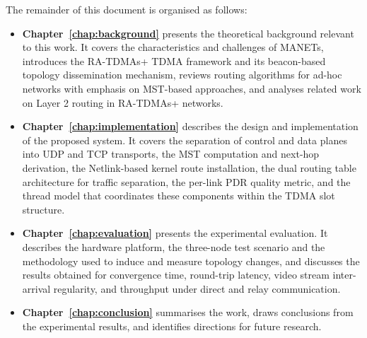 The remainder of this document is organised as follows:

\begin{itemize}

    \item \textbf{Chapter~\ref{chap:background}} presents the theoretical
    background relevant to this work. It covers the characteristics and
    challenges of MANETs, introduces the RA-TDMAs+ TDMA framework and its
    beacon-based topology dissemination mechanism, reviews routing algorithms
    for ad-hoc networks with emphasis on MST-based approaches, and analyses
    related work on Layer 2 routing in RA-TDMAs+ networks.

    \item \textbf{Chapter~\ref{chap:implementation}} describes the design and
    implementation of the proposed system. It covers the separation of control
    and data planes into UDP and TCP transports, the MST computation and
    next-hop derivation, the Netlink-based kernel route installation, the dual
    routing table architecture for traffic separation, the per-link PDR quality
    metric, and the thread model that coordinates these components within the
    TDMA slot structure.

    \item \textbf{Chapter~\ref{chap:evaluation}} presents the experimental
    evaluation. It describes the hardware platform, the three-node test
    scenario and the methodology used to induce and measure topology changes,
    and discusses the results obtained for convergence time, round-trip
    latency, video stream inter-arrival regularity, and throughput under direct
    and relay communication.

    \item \textbf{Chapter~\ref{chap:conclusion}} summarises the work, draws
    conclusions from the experimental results, and identifies directions for
    future research.

\end{itemize}
